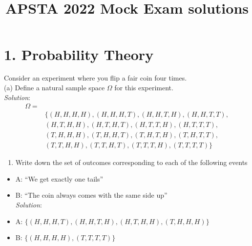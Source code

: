 \documentclass[
]{article}
\title{APSTA 2022 Mock Exam solutions}
\author{}
\date{\vspace{-2.5em}}
\providecommand{\tightlist}{%
  \setlength{\itemsep}{0pt}\setlength{\parskip}{0pt}}
\begin{document}
\maketitle

\hypertarget{probability-theory}{%
\section{1. Probability Theory}\label{probability-theory}}

Consider an experiment where you flip a fair coin four times.\\
(a) Define a natural sample space \(\Omega\) for this experiment.\\
\emph{Solution}:\\
\[
\begin{aligned}
\Omega=&\\
&\{(H,H,H,H), (H,H,H,T), (H,H,T,H), (H,H,T,T), \\
&(H,T,H,H), (H,T,H,T), (H,T,T,H), (H,T,T,T),  \\
&(T,H,H,H), (T,H,H,T), (T,H,T,H), (T,H,T,T),  \\
&(T,T,H,H), (T,T,H,T), (T,T,T,H), (T,T,T,T)\}
\end{aligned}
\]

\begin{enumerate}
\def\labelenumi{(\alph{enumi})}
\setcounter{enumi}{1}
\tightlist
\item
  Write down the set of outcomes corresponding to each of the following
  events\\
\end{enumerate}

\begin{itemize}
\tightlist
\item
  A: ``We get exactly one tails''\\
\item
  B: ``The coin always comes with the same side up''\\
  \emph{Solution}:\\
\item
  A: \(\{(H,H,H,T), (H,H,T,H), (H,T,H,H), (T,H,H,H)\}\)\\
\item
  B: \(\{(H,H,H,H), (T,T,T,T)\}\)
\end{itemize}
\end{document}
